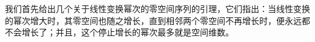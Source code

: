 

我们首先给出几个关于线性变换幂次的零空间序列的引理，它们指出：当线性变换的幂次增大时，其零空间也随之增长，直到相邻两个零空间不再增长时，便永远都不会增长了；并且，这个停止增长的幂次最多就是空间维数。


